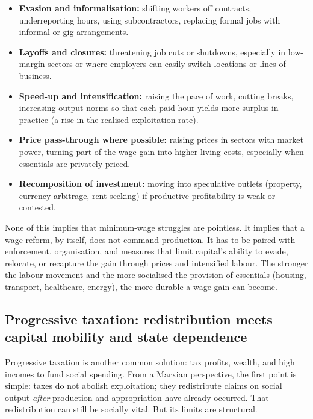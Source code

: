 \begin{itemize}[leftmargin=1.5em]
  \item \textbf{Evasion and informalisation:} shifting workers off contracts, underreporting hours, using
  subcontractors, replacing formal jobs with informal or gig arrangements.
  \item \textbf{Layoffs and closures:} threatening job cuts or shutdowns, especially in low-margin sectors or
  where employers can easily switch locations or lines of business.
  \item \textbf{Speed-up and intensification:} raising the pace of work, cutting breaks, increasing output norms
  so that each paid hour yields more surplus in practice (a rise in the realised exploitation rate).
  \item \textbf{Price pass-through where possible:} raising prices in sectors with market power, turning part of
  the wage gain into higher living costs, especially when essentials are privately priced.
  \item \textbf{Recomposition of investment:} moving into speculative outlets (property, currency arbitrage,
  rent-seeking) if productive profitability is weak or contested.
\end{itemize}

None of this implies that minimum-wage struggles are pointless. It implies that a wage reform, by itself, does not
command production. It has to be paired with enforcement, organisation, and measures that limit capital's ability to
evade, relocate, or recapture the gain through prices and intensified labour. The stronger the labour movement and
the more socialised the provision of essentials (housing, transport, healthcare, energy), the more durable a wage gain
can become.

\subsection{Progressive taxation: redistribution meets capital mobility and state dependence}
\label{sec:policy-taxation}

Progressive taxation is another common solution: tax profits, wealth, and high incomes to fund social spending. From a
Marxian perspective, the first point is simple: taxes do not abolish exploitation; they redistribute claims on social
output \emph{after} production and appropriation have already occurred. That redistribution can still be socially vital.
But its limits are structural.

